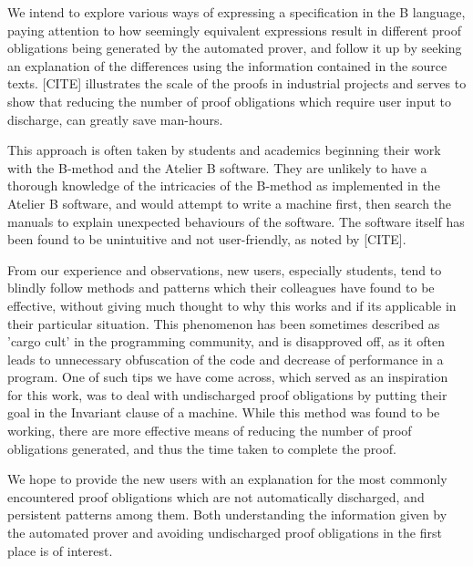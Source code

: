 \documentclass[11pt,journal]{IEEEtran}
\begin{document}
	We intend to explore various ways of expressing a specification in the B language, paying attention to how seemingly equivalent expressions result in different proof obligations being generated by the automated prover, and follow it up by seeking an explanation of the differences using the information contained in the source texts. [CITE] illustrates the scale of the proofs in industrial projects and serves to show that reducing the number of proof obligations which require user input to discharge, can greatly save man-hours.
	
	This approach is often taken by students and academics beginning their work with the B-method and the Atelier B software. They are unlikely to have a thorough knowledge of the intricacies of the B-method as implemented in the Atelier B software, and would attempt to write a machine first, then search the manuals to explain unexpected behaviours of the software. The software itself has been found to be unintuitive and not user-friendly, as noted by [CITE].
	
	From our experience and observations, new users, especially students, tend to blindly follow methods and patterns which their colleagues have found to be effective, without giving much thought to why this works and if its applicable in their particular situation. This phenomenon has been sometimes described as 'cargo cult' in the programming community\cite{Cargo culting}, and is disapproved off, as it often leads to unnecessary obfuscation of the code and decrease of performance in a program. One of such tips we have come across, which served as an inspiration for this work, was to deal with undischarged proof obligations by putting their goal in the Invariant clause of a machine. While this method was found to be working, there are more effective means of reducing the number of proof obligations generated, and thus the time taken to complete the proof.
	
	We hope to provide the new users with an explanation for the most commonly encountered proof obligations which are not automatically discharged, and persistent patterns among them. Both understanding the information given by the automated prover and avoiding undischarged proof obligations in the first place is of interest.
	
\end{document}
